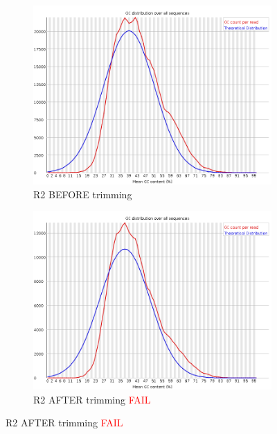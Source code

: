 \documentclass{article}
\begin{document}
\begin{figure}[!htb]
\begin{subfigure}{0.45\linewidth}
\end{subfigure}
\begin{subfigure}{0.45\linewidth}
\vspace{5 mm}
\includegraphics[width=\linewidth]{04-D15-22373-HT-Nextera-Myeloid-Val1-Repeat_S4_L001_R2_001_fastqc/Images/per_sequence_gc_content.png}
\caption{R2 BEFORE trimming}
\end{subfigure}
\begin{subfigure}{0.45\linewidth}
\vspace{5 mm}
\includegraphics[width=\linewidth]{04-D15-22373-HT-Nextera-Myeloid-Val1-Repeat_S4_L001_R2_001.qfilter_fastqc/Images/per_sequence_gc_content.png}
\caption{R2 AFTER trimming \textcolor{red}{FAIL}}
\end{subfigure}
\end{figure}
\end{document}
